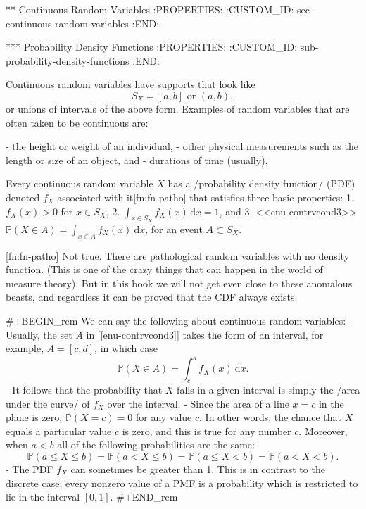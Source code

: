 ** Continuous Random Variables
:PROPERTIES:
:CUSTOM_ID: sec-continuous-random-variables
:END:

*** Probability Density Functions
:PROPERTIES:
:CUSTOM_ID: sub-probability-density-functions
:END:

Continuous random variables have supports that look like
\begin{equation}
S_{X}=[a,b]\mbox{ or }(a,b),
\end{equation}
or unions of intervals of the above form. Examples of random variables
that are often taken to be continuous are:

- the height or weight of an individual,
- other physical measurements such as the length or size of an object,
  and
- durations of time (usually).

Every continuous random variable \(X\) has a /probability density
function/ (PDF) denoted \(f_{X}\) associated with it[fn:fn-patho] that
satisfies three basic properties:
1. \(f_{X}(x)>0\) for \(x\in S_{X}\),
2. \(\int_{x\in S_{X}}f_{X}(x)\,\mathrm{d} x=1\), and
3. <<enu-contrvcond3>> \(\mathbb{P}(X\in A)=\int_{x\in
   A}f_{X}(x)\:\mathrm{d} x\), for an event \(A\subset S_{X}\).

[fn:fn-patho] Not true. There are pathological random variables with
no density function. (This is one of the crazy things that can happen
in the world of measure theory). But in this book we will not get even
close to these anomalous beasts, and regardless it can be proved that
the CDF always exists.

#+BEGIN_rem
We can say the following about continuous random variables:
- Usually, the set \(A\) in [[enu-contrvcond3]] takes the form of an
  interval, for example, \(A=[c,d]\), in which case
  \begin{equation}
  \mathbb{P}(X\in A)=\int_{c}^{d}f_{X}(x)\:\mathrm{d} x.
  \end{equation}
- It follows that the probability that \(X\) falls in a given interval
  is simply the /area under the curve/ of \(f_{X}\) over the interval.
- Since the area of a line \(x=c\) in the plane is zero,
  \(\mathbb{P}(X=c)=0\) for any value \(c\). In other words, the
  chance that \(X\) equals a particular value \(c\) is zero, and this
  is true for any number \(c\). Moreover, when \(a<b\) all of the
  following probabilities are the same:
  \begin{equation}
  \mathbb{P}(a\leq X\leq b)=\mathbb{P}(a<X\leq b)=\mathbb{P}(a\leq X<b)=\mathbb{P}(a<X<b).
  \end{equation}
- The PDF \(f_{X}\) can sometimes be greater than 1. This is in
  contrast to the discrete case; every nonzero value of a PMF is a
  probability which is restricted to lie in the interval \([0,1]\).
#+END_rem


